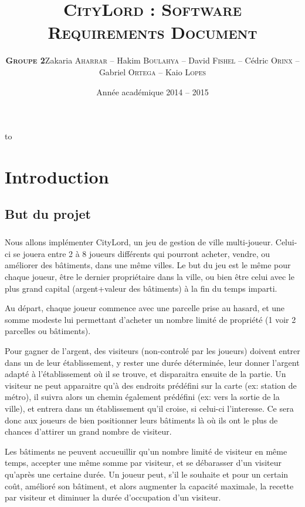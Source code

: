 \documentclass[a4paper,11pt]{report}
\date{Année académique 2014 – 2015}
\title{ \textsc{CityLord} :
\textsc{Software Requirements Document}\\}
\author{\textsc{\textbf{Groupe 2}}\newline Zakaria \textsc{Aharrar} – Hakim \textsc{Boulahya} – David \textsc{Fishel} – Cédric \textsc{Orinx} – Gabriel \textsc{Ortega} – Kaio \textsc{Lopes}}
\makeatletter
\def\clap#1{\hbox to 0pt{\hss #1\hss}}%
\def\haut#1#2#3{%
\hbox to \hsize{%
\rlap{\vtop{\centering #1}}%
\hss
\clap{\vtop{\centering #2}}%
\hss
\llap{\vtop{\centering #3}}}}%
\def\bas#1#2#3{%
\hbox to \hsize{%
\rlap{\vbox{\centering #1}}%
\hss
\clap{\vbox{\centering #2}}%
\hss
\llap{\vbox{\centering #3}}}}%
\def\maketitle{%
\thispagestyle{empty}\vbox to \vsize{%
\haut{}{\@blurb}{}
\vfill
\vspace{1cm}
\begin{flushleft}
\usefont{OT1}{ptm}{m}{n}
\huge \@title
\end{flushleft}
\par
\hrule height 4pt
\par
\begin{flushright}
\usefont{OT1}{phv}{m}{n}
\Large \@author
\par
\end{flushright}
\vspace{1cm}
\vfill
\vfill
\bas{}{\@date}{}
}%
\cleardoublepage
}
\makeatother
\begin{document}
\maketitle
\tableofcontents
\clearpage

\chapter{Introduction}
\section{But du projet}
\paragraph{}
Nous allons implémenter CityLord, un jeu de gestion de ville multi-joueur.
Celui-ci se jouera entre 2 à 8 joueurs différents qui pourront acheter, vendre, ou améliorer des bâtiments, dans une même villes.
Le but du jeu est le même pour chaque joueur, être le dernier propriétaire dans la ville, ou bien être celui avec le plus grand capital (argent+valeur des bâtiments) à la fin du temps imparti.

Au départ, chaque joueur commence avec une parcelle prise au hasard, et une somme modeste lui permettant d'acheter un nombre limité de propriété (1 voir 2 parcelles ou bâtiments).

Pour gagner de l'argent, des visiteurs (non-controlé par les joueurs) doivent entrer dans un de leur établissement, y rester une durée déterminée, leur donner l'argent adapté à l'établissement où il se trouve, et disparaitra ensuite de la partie.
Un visiteur ne peut apparaitre qu'à des endroits prédéfini sur la carte (ex: station de métro), il suivra alors un chemin également prédéfini (ex: vers la sortie de la ville), et entrera dans un établissement qu'il croise, si celui-ci l'interesse.
Ce sera donc aux joueurs de bien positionner leurs bâtiments là où ils ont le plus de chances d'attirer un grand nombre de visiteur.

Les bâtiments ne peuvent accueuillir qu'un nombre limité de visiteur en même temps, accepter une même somme par visiteur, et se débarasser d'un visiteur qu'après une certaine durée.
Un joueur peut, s'il le souhaite et pour un certain coût, amélioré son bâtiment, et alors augmenter la capacité maximale, la recette par visiteur et diminuer la durée d'occupation d'un visiteur.
\end{document}
